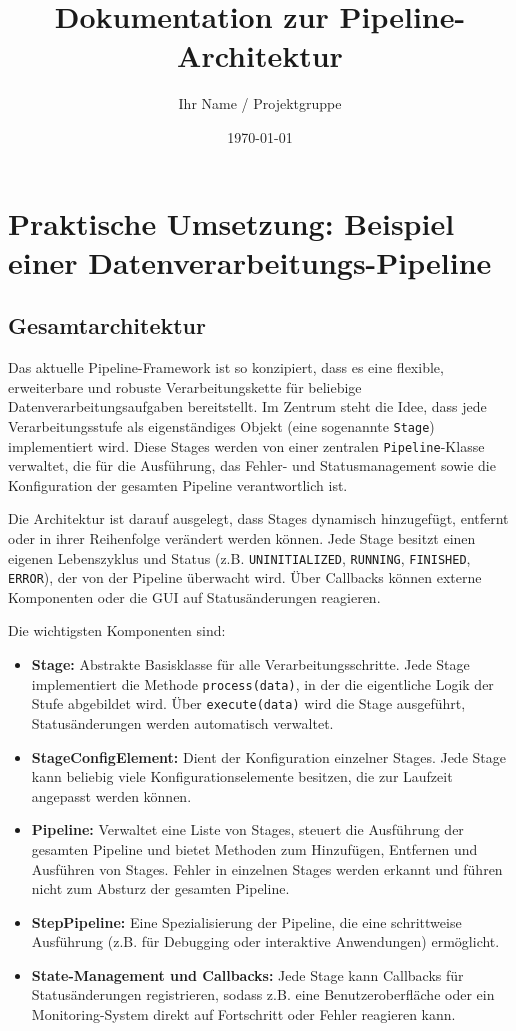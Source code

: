 \documentclass[a4paper]{article} %
\title{Dokumentation zur Pipeline-Architektur}
\author{Ihr Name / Projektgruppe}
\date{\today}
\begin{document}
\section{Praktische Umsetzung: Beispiel einer Datenverarbeitungs-Pipeline}
\subsection{Gesamtarchitektur}

Das aktuelle Pipeline-Framework ist so konzipiert, dass es eine flexible, erweiterbare und robuste Verarbeitungskette für beliebige Datenverarbeitungsaufgaben bereitstellt. Im Zentrum steht die Idee, dass jede Verarbeitungsstufe als eigenständiges Objekt (eine sogenannte \texttt{Stage}) implementiert wird. Diese Stages werden von einer zentralen \texttt{Pipeline}-Klasse verwaltet, die für die Ausführung, das Fehler- und Statusmanagement sowie die Konfiguration der gesamten Pipeline verantwortlich ist.

Die Architektur ist darauf ausgelegt, dass Stages dynamisch hinzugefügt, entfernt oder in ihrer Reihenfolge verändert werden können. Jede Stage besitzt einen eigenen Lebenszyklus und Status (z.B. \texttt{UNINITIALIZED}, \texttt{RUNNING}, \texttt{FINISHED}, \texttt{ERROR}), der von der Pipeline überwacht wird. Über Callbacks können externe Komponenten oder die GUI auf Statusänderungen reagieren.

Die wichtigsten Komponenten sind:
\begin{itemize}
    \item \textbf{Stage:} Abstrakte Basisklasse für alle Verarbeitungsschritte. Jede Stage implementiert die Methode \texttt{process(data)}, in der die eigentliche Logik der Stufe abgebildet wird. Über \texttt{execute(data)} wird die Stage ausgeführt, Statusänderungen werden automatisch verwaltet.
    \item \textbf{StageConfigElement:} Dient der Konfiguration einzelner Stages. Jede Stage kann beliebig viele Konfigurationselemente besitzen, die zur Laufzeit angepasst werden können.
    \item \textbf{Pipeline:} Verwaltet eine Liste von Stages, steuert die Ausführung der gesamten Pipeline und bietet Methoden zum Hinzufügen, Entfernen und Ausführen von Stages. Fehler in einzelnen Stages werden erkannt und führen nicht zum Absturz der gesamten Pipeline.
    \item \textbf{StepPipeline:} Eine Spezialisierung der Pipeline, die eine schrittweise Ausführung (z.B. für Debugging oder interaktive Anwendungen) ermöglicht.
    \item \textbf{State-Management und Callbacks:} Jede Stage kann Callbacks für Statusänderungen registrieren, sodass z.B. eine Benutzeroberfläche oder ein Monitoring-System direkt auf Fortschritt oder Fehler reagieren kann.
\end{itemize}
\end{document}
